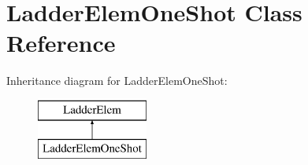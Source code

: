 \hypertarget{class_ladder_elem_one_shot}{\section{Ladder\-Elem\-One\-Shot Class Reference}
\label{class_ladder_elem_one_shot}
}
Inheritance diagram for Ladder\-Elem\-One\-Shot\-:\begin{figure}[H]
\begin{center}
\leavevmode
\includegraphics[height=2.000000cm]{class_ladder_elem_one_shot}
\end{center}
\end{figure}

